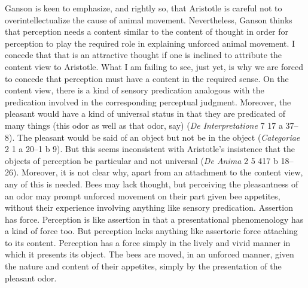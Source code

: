\documentclass[12pt]{article}
\begin{document}
Ganson is keen to emphasize, and rightly so, that Aristotle is careful not to overintellectualize the cause of animal movement. Nevertheless, Ganson thinks that perception needs a content similar to the content of thought in order for perception to play the required role in explaining unforced animal movement. I concede that that is an attractive thought if one is inclined to attribute the content view to Aristotle. What I am failing to see, just yet, is why we are forced to concede that perception must have a content in the required sense. On the content view, there is a kind of sensory predication analogous with the predication involved in the corresponding perceptual judgment. Moreover, the pleasant would have a kind of universal status in that they are predicated of many things (this odor as well as that odor, say) (\emph{De Interpretatione} 7 17 a 37--8). The pleasant would be said of an object but not be in the object (\emph{Categoriae} 2 1 a 20--1 b 9). But this seems inconsistent with Aristotle's insistence that the objects of perception be particular and not universal (\emph{De Anima} 2 5 417 b 18--26). Moreover, it is not clear why, apart from an attachment to the content view, any of this is needed. Bees may lack thought, but perceiving the pleasantness of an odor may prompt unforced movement on their part given bee appetites, without their experience involving anything like sensory predication. Assertion has force. Perception is like assertion in that a presentational phenomenology has a kind of force too. But perception lacks anything like assertoric force attaching to its content. Perception has a force simply in the lively and vivid manner in which it presents its object. The bees are moved, in an unforced manner, given the nature and content of their appetites, simply by the presentation of the pleasant odor.













\end{document}
